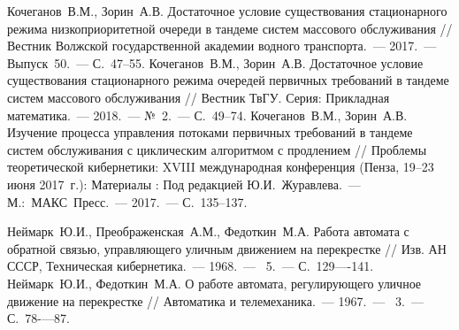 \documentclass{report}
\newcommand{\No}{\textnumero}
\begin{document}
\begin{thebibliography}{99}
 Кочеганов~В.М., Зорин~А.В. Достаточное условие существования стационарного режима низкоприоритетной очереди в тандеме систем массового обслуживания // Вестник Волжской государственной академии водного транспорта.~--- 2017.~--- Выпуск~50.~--- С.~47--55.
 Кочеганов~В.М., Зорин~А.В. Достаточное условие существования стационарного режима очередей первичных требований в тандеме систем массового обслуживания // Вестник ТвГУ. Серия: Прикладная математика.~--- 2018.~--- №~2.~--- С.~49--74.
 Кочеганов~В.М., Зорин~А.В. Изучение процесса управления потоками первичных требований в тандеме систем обслуживания с циклическим алгоритмом с продлением // Проблемы теоретической кибернетики: XVIII международная конференция (Пенза, 19--23 июня 2017~г.): Материалы : Под редакцией Ю.И.~Журавлева.~--- М.:~МАКС~Пресс.~--- 2017.~--- С.~135--137.

 Неймарк~Ю.И., Преображенская~А.М., Федоткин~М.А. Работа автомата с обратной связью, управляющего уличным движением на перекрестке // Изв. АН СССР, Техническая кибернетика.~--- 1968.~--- \No{}~5.~--- С.~129—-141. 
 Неймарк~Ю.И., Федоткин~М.А. О работе автомата, регулирующего уличное движение на перекрестке // Автоматика и телемеханика.~--- 1967.~--- \No{}~3.~--- С.~78-—87.  


\end{thebibliography}
\end{document}

